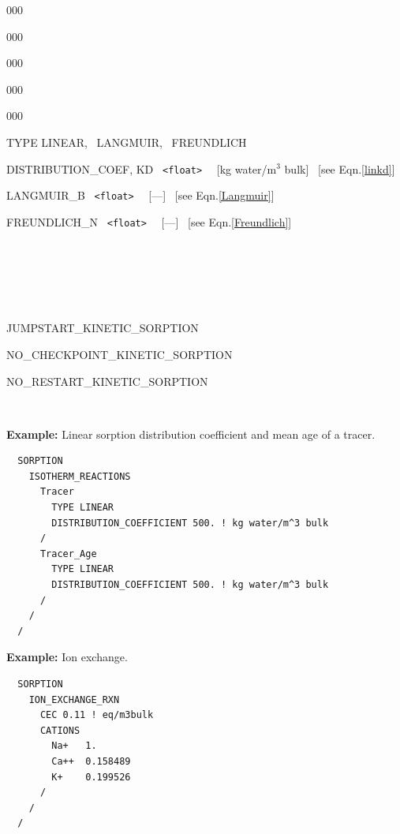 \begin{deflist}{000}
\begin{deflist}{000}
\begin{deflist}{000}
\begin{deflist}{000}
\begin{deflist}{000}
\item [TYPE] LINEAR, \ LANGMUIR, \ FREUNDLICH
\item [DISTRIBUTION\_COEF, KD] \ {\tt <float>} \ \ [kg water/m$^3$ bulk] \ [see Eqn.\eqref{linkd}]
\item [LANGMUIR\_B] \ {\tt <float>} \ \ [---] \ [see Eqn.\eqref{Langmuir}]
\item [FREUNDLICH\_N] \ {\tt <float>} \ \ [---] \ [see Eqn.\eqref{Freundlich}]
\end{deflist}
\item [\keyend] ~

\end{deflist}

\item [\keyend] ~
\end{deflist}

~\\

\item[JUMPSTART\_KINETIC\_SORPTION]
\item[NO\_CHECKPOINT\_KINETIC\_SORPTION]
\item[NO\_RESTART\_KINETIC\_SORPTION]
\end{deflist}

\item [\keyend]

~\\

\begin{mdframed}
{\bf Example:} Linear sorption distribution coefficient and mean age of a tracer.
\footnotesize
\begin{verbatim}
  SORPTION
    ISOTHERM_REACTIONS
      Tracer
        TYPE LINEAR 
        DISTRIBUTION_COEFFICIENT 500. ! kg water/m^3 bulk
      /
      Tracer_Age
        TYPE LINEAR 
        DISTRIBUTION_COEFFICIENT 500. ! kg water/m^3 bulk
      /
    /
  /
\end{verbatim}
\normalsize
\end{mdframed}

\begin{mdframed}
{\bf Example:} Ion exchange.
\footnotesize
\begin{verbatim}
  SORPTION
    ION_EXCHANGE_RXN
      CEC 0.11 ! eq/m3bulk
      CATIONS
        Na+   1.
        Ca++  0.158489
        K+    0.199526
      /
    /
  /
\end{verbatim}
\normalsize
\end{mdframed}


\end{deflist}

